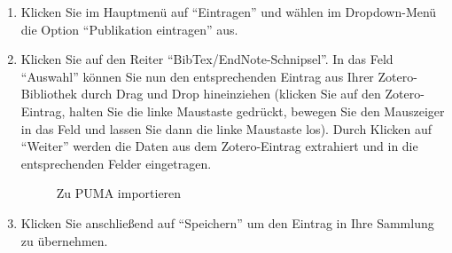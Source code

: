 \begin{enumerate}
    \item Klicken Sie im Hauptmenü auf \enquote{Eintragen} und wählen im Dropdown-Menü die Option \enquote{Publikation eintragen} aus.  
    \item Klicken Sie auf den Reiter \enquote{BibTex/EndNote-Schnipsel}. In das Feld \enquote{Auswahl} können Sie nun den entsprechenden Eintrag aus Ihrer Zotero-Bibliothek durch Drag und Drop hineinziehen (klicken Sie auf den Zotero-Eintrag, halten Sie die linke Maustaste gedrückt, bewegen Sie den Mauszeiger in das Feld und lassen Sie dann die linke Maustaste los). Durch Klicken auf \enquote{Weiter} werden die Daten aus dem Zotero-Eintrag extrahiert und in die entsprechenden Felder eingetragen. 
\begin{figure}[h!]
 \centering
 \caption{Zu PUMA importieren}
 \label{fig:zuPumaImportieren}
\end{figure}
    \item Klicken Sie anschließend auf \enquote{Speichern} um den Eintrag in Ihre Sammlung zu übernehmen.
\end{enumerate}  

